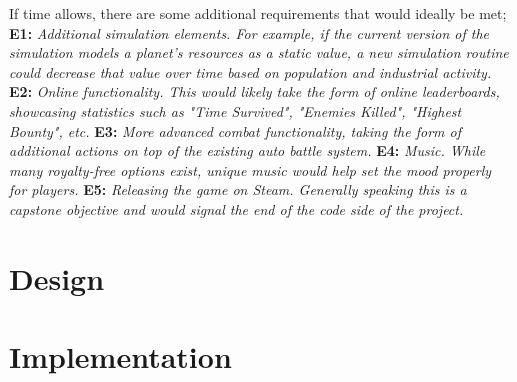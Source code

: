 \documentclass{report}
\newcommand{\req}[2]{\textbf{		#1:  }	\textit{#2}\newline\newline}
\begin{document}
If time allows, there are some additional requirements that would ideally be met;
\newline
\newline
\req{E1}{Additional simulation elements. For example, if the current version of the simulation models a planet's resources as a static value, a new simulation routine could decrease that value over time based on population and industrial activity.}
\req{E2}{Online functionality. This would likely take the form of online leaderboards, showcasing statistics such as "Time Survived", "Enemies Killed", "Highest Bounty", etc.}
\req{E3}{More advanced combat functionality, taking the form of additional actions on top of the existing auto battle system. }
\req{E4}{Music. While many royalty-free options exist, unique music would help set the mood properly for players.}
\req{E5}{Releasing the game on Steam. Generally speaking this is a capstone objective and would signal the end of the code side of the project. }

\chapter{Design}

\chapter{Implementation}

\end{document}
